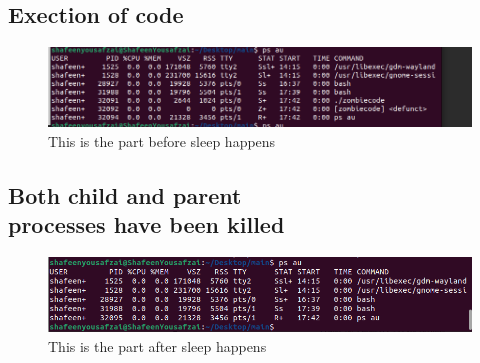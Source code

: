 \documentclass[12pt]{article}
\begin{document}
\subsection{Exection of code}
\begin{figure}[H]
    \centering
    \includegraphics[width=\textwidth]{3213.png}
    \caption{This is the part before sleep happens}
    \label{fig:enter-label}
\end{figure}
\subsection{Both child and parent \\processes have been killed}
\begin{figure}[H]
    \centering
    \includegraphics[width=\textwidth]{dsadsada.png}
    \caption{This is the part after sleep happens}
    \label{fig:enter-label}
\end{figure}
\end{document}
